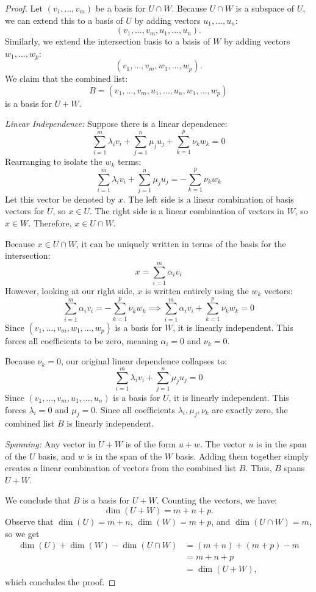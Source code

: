 \documentclass[../linear_algebra_and_groups.tex]{subfiles}
\begin{document}
\begin{proof}
    Let $(v_1,\dots,v_m)$ be a basis for $U\cap W$. 
    Because $U\cap W$ is a subspace of $U$, we can extend this to a basis of $U$ by adding vectors $u_1,\dots,u_n$:
    \[ (v_1,\dots,v_m,u_1,\dots,u_n). \]
    Similarly, we extend the intersection basis to a basis of $W$ by adding vectors $w_1,\dots,w_p$:
    \[ (v_1,\dots,v_m,w_1,\dots,w_p). \]
    We claim that the combined list:
    \[ B = (v_1,\dots,v_m,u_1,\dots,u_n,w_1,\dots,w_p) \]
    is a basis for $U+W$.
    
    \textit{Linear Independence:} Suppose there is a linear dependence:
    \[ \sum_{i=1}^m \lambda_i v_i + \sum_{j=1}^n \mu_j u_j + \sum_{k=1}^p \nu_k w_k = 0 \]
    Rearranging to isolate the $w_k$ terms:
    \[ \sum_{i=1}^m \lambda_i v_i + \sum_{j=1}^n \mu_j u_j = - \sum_{k=1}^p \nu_k w_k \]
    Let this vector be denoted by $x$. The left side is a linear combination of basis vectors for $U$, so $x \in U$. The right side is a linear combination of vectors in $W$, so $x \in W$. Therefore, $x \in U \cap W$.
    
    Because $x \in U\cap W$, it can be uniquely written in terms of the basis for the intersection:
    \[ x = \sum_{i=1}^m \alpha_i v_i \]
    However, looking at our right side, $x$ is written entirely using the $w_k$ vectors:
    \[ \sum_{i=1}^m \alpha_i v_i = - \sum_{k=1}^p \nu_k w_k \implies \sum_{i=1}^m \alpha_i v_i + \sum_{k=1}^p \nu_k w_k = 0 \]
    Since $(v_1,\dots,v_m,w_1,\dots,w_p)$ is a basis for $W$, it is linearly independent. This forces all coefficients to be zero, meaning $\alpha_i = 0$ and $\nu_k = 0$. 
    
    Because $\nu_k = 0$, our original linear dependence collapses to:
    \[ \sum_{i=1}^m \lambda_i v_i + \sum_{j=1}^n \mu_j u_j = 0 \]
    Since $(v_1,\dots,v_m,u_1,\dots,u_n)$ is a basis for $U$, it is linearly independent. This forces $\lambda_i = 0$ and $\mu_j = 0$. Since all coefficients $\lambda_i, \mu_j, \nu_k$ are exactly zero, the combined list $B$ is linearly independent.
    
    \textit{Spanning:} Any vector in $U+W$ is of the form $u+w$. The vector $u$ is in the span of the $U$ basis, and $w$ is in the span of the $W$ basis. Adding them together simply creates a linear combination of vectors from the combined list $B$. Thus, $B$ spans $U+W$.\par
    We conclude that $B$ is a basis for $U+W$. Counting the vectors, we have:
    \[ \dim(U+W) = m + n + p.\]
    Observe that $\dim(U) = m+n$, $\dim(W) = m+p$, and $\dim(U\cap W) = m$, so we get
    \begin{align*}
        \dim(U) + \dim(W) - \dim(U\cap W) &= (m+n) + (m+p) - m \\
        &= m+n+p \\
        &= \dim(U+W),
    \end{align*}
    which concludes the proof.\qedhere
\end{proof}
\end{document}
